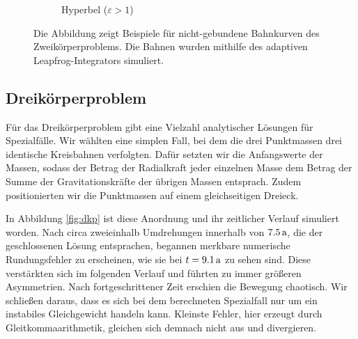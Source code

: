 \begin{figure}[h]
\begin{subfigure}[b]{0.49\textwidth}
        \caption{Hyperbel ($\varepsilon >1$)}
      \end{subfigure}
      \caption{Die Abbildung zeigt Beispiele für nicht-gebundene Bahnkurven des Zweikörperproblems. Die Bahnen wurden mithilfe des adaptiven Leapfrog-Integrators simuliert.}
      \label{fig:zkp-ungebunden}
    \end{figure}


  \subsection{Dreikörperproblem} %
  \label{sub:dreikörperproblem}

    Für das Dreikörperproblem gibt eine Vielzahl analytischer Lösungen für Spezialfälle.
    Wir wählten eine simplen Fall, bei dem die drei Punktmassen drei identische Kreisbahnen verfolgten.
    Dafür setzten wir die Anfangswerte der Massen, sodass der Betrag der Radialkraft jeder einzelnen Masse dem Betrag der Summe der Gravitationskräfte der übrigen Massen entsprach.
    Zudem positionierten wir die Punktmassen auf einem gleichseitigen Dreieck.

    In Abbildung \ref{fig:dkp} ist diese Anordnung und ihr zeitlicher Verlauf simuliert worden.
    Nach circa zweieinhalb Umdrehungen innerhalb von $7.5\,\mathrm{a}$, die der geschlossenen Lösung entsprachen, begannen merkbare numerische Rundungsfehler zu erscheinen, wie sie bei $t=9.1\,\mathrm{a}$ zu sehen sind.
    Diese verstärkten sich im folgenden Verlauf und führten zu immer größeren Asymmetrien.
    Nach fortgeschrittener Zeit erschien die Bewegung chaotisch.
    Wir schließen daraus, dass es sich bei dem berechneten Spezialfall nur um ein instabiles Gleichgewicht handeln kann.
    Kleinste Fehler, hier erzeugt durch Gleitkommaarithmetik, gleichen sich demnach nicht aus und divergieren.

